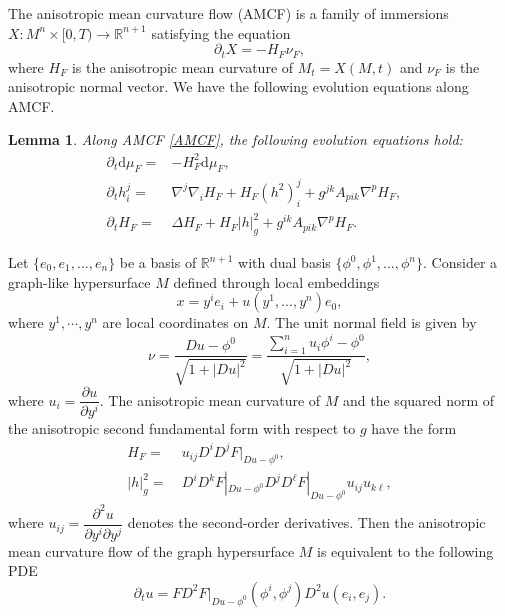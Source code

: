 \documentclass[10pt,a4paper]{amsart}
\newtheorem{lemma}[proposition]{Lemma}
\numberwithin{equation}{section}
\begin{document}
The anisotropic mean curvature flow (AMCF) is a family of immersions $X:M^n\times[0,T)\to\mathbb{R}^{n+1}$ satisfying the equation
	\begin{equation}
		\label{AMCF}
		\partial_t X = -H_F\nu_F,
	\end{equation}
	where $H_F$ is the anisotropic mean curvature of $M_t=X(M,t)$ and $\nu_F$ is the anisotropic normal vector.  We have the following evolution equations along AMCF. 
	
	\begin{lemma}
		Along AMCF \eqref{AMCF}, the following evolution equations hold:
		\begin{align}
            \partial_t \mathrm{d}\mu_F =& - H_F^2 \mathrm{d}\mu_F, &\label{equ-amcfarea}\\
			\partial_t h^j_i =& \nabla^j\nabla_i H_F + H_F (h^2)^j_i +  g^{jk}A_{pik}\nabla^p H_F, \label{equ-aniwei}\\
			\partial_t H_F =& \Delta H_F + H_F |h|_{g}^2 +  g^{ik}A_{pik}\nabla^p H_F. \label{equ-amceq}
		\end{align}
	\end{lemma}

	
	Let $\{e_{0},e_{1},...,e_{n}\}$ be a basis of $\mathbb{R}^{n+1}$ with dual basis $\{\phi^{0},\phi^{1},...,\phi^{n}\}$. Consider a graph-like hypersurface $M$ defined through local embeddings
	\begin{equation*}
		x=y^{i}e_{i}+u(y^{1},...,y^{n})e_{0},
	\end{equation*}
	where $y^1,\cdots,y^n$ are local coordinates on $M$. The unit normal field is given by
	\begin{equation*}
		\nu = \dfrac{Du - \phi^0}{\sqrt{1+|Du|^2}} = \dfrac{\sum_{i=1}^{n}u_{i}\phi^{i}-\phi^0}{\sqrt{1+|Du|^2}},
	\end{equation*}
	where $u_i=\dfrac{\partial u}{\partial y^i}$. The anisotropic mean curvature of $M$ and the squared norm of the anisotropic second fundamental form with respect to $g$ have the form 
	\begin{align*}
		H_F = &~u_{ij}D^iD^j F|_{Du-\phi^0},\\ 
        |h|_{g}^2 = & ~D^iD^kF|_{Du-\phi^0}D^jD^{\ell}F|_{Du-\phi^0} u_{ij}u_{k\ell},
	\end{align*}
    where $u_{ij}=\dfrac{\partial^2 u}{\partial y^i \partial y^j}$ denotes the second-order derivatives. Then the anisotropic mean curvature flow of the graph hypersurface $M$ is equivalent to the following PDE
	\begin{equation*}
		\partial_tu=FD^2F|_{Du-\phi^0}(\phi^i,\phi^j)D^2u(e_i,e_j).
	\end{equation*}
	
\end{document}

